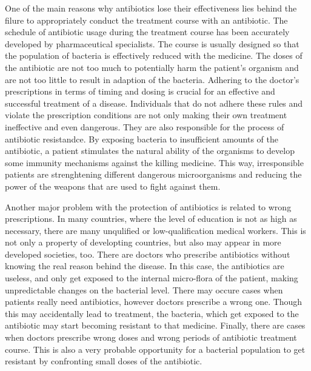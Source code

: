 One of the main reasons why antibiotics lose their effectiveness lies behind the filure to appropriately conduct the treatment course with an antibiotic. The schedule of antibiotic usage during the treatment course has been accurately developed by pharmaceutical specialists. The course is usually designed so that the population of bacteria is effectively reduced with the medicine. The doses of the antibiotic are not too much to potentially harm the patient's organism and are not too little to result in adaption of the bacteria. Adhering to the doctor's prescriptions in terms of timing and dosing is crucial for an effective and successful treatment of a disease. Individuals that do not adhere these rules and violate the prescription conditions are not only making their own treatment ineffective and even dangerous. They are also responsible for the process of antibiotic resistandce. By exposing bacteria to insufficient amounts of the antibiotic, a patient stimulates the natural ability of the organisms to develop some immunity mechanisms against the killing medicine. This way, irresponsible patients are strenghtening different dangerous microorganisms and reducing the power of the weapons that are used to fight against them.

Another major problem with the protection of antibiotics is related to wrong prescriptions. In many countries, where the level of education is not as high as necessary, there are many unqulified or low-qualification medical workers. This is not only a property of developting countries, but also may appear in more developed societies, too. There are doctors who prescribe antibiotics without knowing the real reason behind the disease. In this case, the antibiotics are useless, and only get exposed to the internal micro-flora of the patient, making unpredictable changes on the bacterial level. There may occure cases when patients really need antibiotics, however doctors prescribe a wrong one. Though this may accidentally lead to treatment, the bacteria, which get exposed to the antibiotic may start becoming resistant to that medicine. Finally, there are cases when doctors prescribe wrong doses and wrong periods of antibiotic treatment course. This is also a very probable opportunity for a bacterial population to get resistant by confronting small doses of the antibiotic.